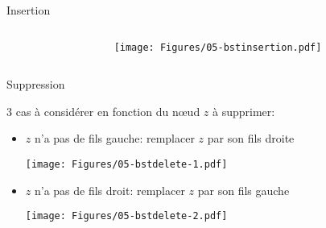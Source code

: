 \begin{frame}{Insertion}

  \begin{columns}
    \begin{column}{5cm}
\begin{center}
\begin{small}
\end{small}
\end{center}
    \end{column}
    \begin{column}{5cm}
      \begin{center}
      \texttt{[image: Figures/05-bstinsertion.pdf]}
      \end{center}
    \end{column}
  \end{columns}

\end{frame}

\begin{frame}{Suppression}

3 cas à considérer en fonction du n\oe ud $z$ à supprimer:
\begin{itemize}
\item $z$ n'a pas de fils gauche: remplacer $z$ par son fils droite
\centerline{\texttt{[image: Figures/05-bstdelete-1.pdf]}}
\item $z$ n'a pas de fils droit: remplacer $z$ par son fils gauche
\centerline{\texttt{[image: Figures/05-bstdelete-2.pdf]}}
\end{itemize}

\end{frame}

